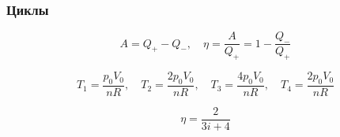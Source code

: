 \documentclass[12pt, a4paper]{article}
\begin{document}
\subsubsection*{Циклы}

\[
A = Q_+ - Q_-, \quad \eta = \frac{A}{Q_+} = 1 - \frac{Q_-}{Q_+}
\]

\[
T_1=\frac{p_0V_0}{nR}, \quad
T_2=\frac{2p_0V_0}{nR}, \quad
T_3=\frac{4p_0V_0}{nR}, \quad
T_4=\frac{2p_0V_0}{nR}
\]

\[
\eta = \frac{2}{3i+4}
\]
\end{document}
